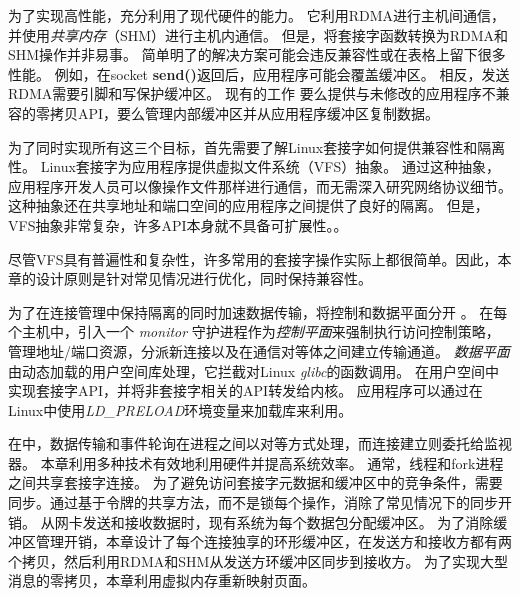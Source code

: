 为了实现高性能，\sys{}充分利用了现代硬件的能力。 它利用RDMA进行主机间通信，并使用\emph {共享内存}（SHM）进行主机内通信。 但是，将套接字函数转换为RDMA和SHM操作并非易事。 简单明了的解决方案可能会违反兼容性或在表格上留下很多性能。 例如，在socket \textbf {send()}返回后，应用程序可能会覆盖缓冲区。 相反，发送RDMA需要引脚和写保护缓冲区。 现有的工作 \cite {rsockets}要么提供与未修改的应用程序不兼容的零拷贝API，要么管理内部缓冲区并从应用程序缓冲区复制数据。

为了同时实现所有这三个目标，首先需要了解Linux套接字如何提供兼容性和隔离性。 Linux套接字为应用程序提供虚拟文件系统（VFS）抽象。 通过这种抽象，应用程序开发人员可以像操作文件那样进行通信，而无需深入研究网络协议细节。 这种抽象还在共享地址和端口空间的应用程序之间提供了良好的隔离。 但是，VFS抽象非常复杂，许多API本身就不具备可扩展性。\cite {clark1989analysis,boyd2010analysis,jeong2014mtcp}。

尽管VFS具有普遍性和复杂性，许多常用的套接字操作实际上都很简单。因此，本章的设计原则是针对常见情况进行优化，同时保持兼容性。

为了在连接管理中保持隔离的同时加速数据传输，\sys {}将控制和数据平面分开 \cite {peter2016arrakis}。
在每个主机中，引入一个 \emph {monitor} 守护进程作为\emph {控制平面}来强制执行访问控制策略，管理地址/端口资源，分派新连接以及在通信对等体之间建立传输通道。
\emph {数据平面}由动态加载的用户空间库\libipc {}处理，它拦截对Linux \emph {glibc}的函数调用。 \libipc {}在用户空间中实现套接字API，并将非套接字相关的API转发给内核。
应用程序可以通过在Linux中使用\emph {LD\_PRELOAD}环境变量来加载库来利用\libipc {}。


在\sys {}中，数据传输和事件轮询在进程之间以对等方式处理，而连接建立则委托给监视器。
本章利用多种技术有效地利用硬件并提高系统效率。
通常，线程和fork进程之间共享套接字连接。
为了避免访问套接字元数据和缓冲区中的竞争条件，需要同步。通过基于令牌的共享方法，而不是锁每个操作，消除了常见情况下的同步开销。
从网卡发送和接收数据时，现有系统为每个数据包分配缓冲区。
为了消除缓冲区管理开销，本章设计了每个连接独享的环形缓冲区，在发送方和接收方都有两个拷贝，然后利用RDMA和SHM从发送方环缓冲区同步到接收方。
为了实现大型消息的零拷贝，本章利用虚拟内存重新映射页面。

\iffalse

